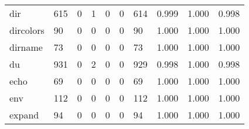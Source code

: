 \begin{longtable}{lp{2.0cm}p{2.0cm}p{2.0cm}p{2.0cm}p{2.0cm}p{2.0cm}p{2.0cm}p{2.0cm}p{2.0cm}}
dir       &                    615 &                                             0 &                                            1 &                                           0 &                                            0 &                                        614 &                                0.999 &                                  1.000 &                                0.998 \\
dircolors &                     90 &                                             0 &                                            0 &                                           0 &                                            0 &                                         90 &                                1.000 &                                  1.000 &                                1.000 \\
dirname   &                     73 &                                             0 &                                            0 &                                           0 &                                            0 &                                         73 &                                1.000 &                                  1.000 &                                1.000 \\
du        &                    931 &                                             0 &                                            2 &                                           0 &                                            0 &                                        929 &                                0.998 &                                  1.000 &                                0.998 \\
echo      &                     69 &                                             0 &                                            0 &                                           0 &                                            0 &                                         69 &                                1.000 &                                  1.000 &                                1.000 \\
env       &                    112 &                                             0 &                                            0 &                                           0 &                                            0 &                                        112 &                                1.000 &                                  1.000 &                                1.000 \\
expand    &                     94 &                                             0 &                                            0 &                                           0 &                                            0 &                                         94 &                                1.000 &                                  1.000 &                                1.000 \\

\end{longtable}

